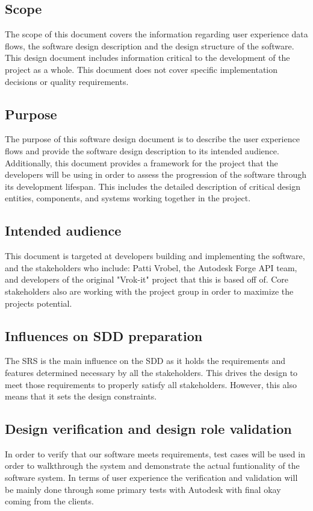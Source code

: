 \documentclass[letterpaper, 10pt, draftclsnofoot, compsoc, onecolumn]{IEEEtran}
\begin{document}
\subsection{Scope}
The scope of this document covers the information regarding user experience data flows, the software design description and the design structure of the software. This design document includes information critical to the development of the project as a whole. This document does not cover specific implementation decisions or quality requirements.
\subsection{Purpose}
The purpose of this software design document is to describe the user experience flows and provide the software design description to its intended audience. Additionally, this document provides a framework for the project that the developers will be using in order to assess the progression of the software through its development lifespan. This includes the detailed description of critical design entities, components, and systems working together in the project.
\subsection{Intended audience}
This document is targeted at developers building and implementing the software, and the stakeholders who include: Patti Vrobel, the Autodesk Forge API team,  and developers of the original "Vrok-it" project that this is based off of. Core stakeholders also are working with the project group in order to maximize the projects potential.

\subsection{Influences on SDD preparation}
The SRS is the main influence on the SDD as it holds the requirements and features determined necessary by all the stakeholders. This drives the design to meet those requirements to properly satisfy all stakeholders. However, this also means that it sets the design constraints.

\subsection{Design verification and design role validation}
In order to verify that our software meets requirements, test cases will be used in order to walkthrough the system and demonstrate the actual funtionality of the software system. In terms of user experience the verification and validation will be mainly done through some primary tests with Autodesk with final okay coming from the clients.
\end{document}
